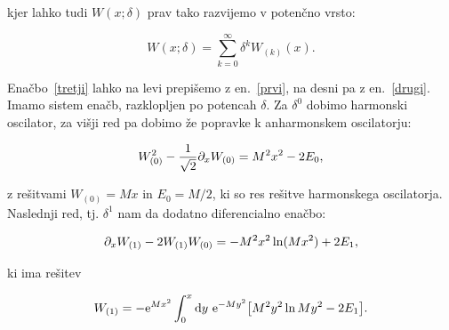\ni kjer lahko tudi $W(x;\delta)$ prav tako razvijemo v poten\v cno vrsto:

\begin{equation}
	W(x;\delta) = \sum_{k = 0}^\infty \delta^k W_{(k)}(x).
	\label{drugi}
\end{equation}

\ni Ena\v cbo~\eqref{tretji} lahko na levi prepi\v semo z en.~\eqref{prvi}, na desni pa z en.~\eqref{drugi}. Imamo sistem
ena\v cb, razklopljen po potencah $\delta$. Za $\delta^0$ dobimo harmonski oscilator, za vi\v sji red pa dobimo \v ze
popravke k anharmonskem oscilatorju:

\begin{equation}
	W_{(0)}^2 - \frac{1}{\sqrt{2}}\partial_x W_{(0)} = M^2x^2 - 2E_0,
\end{equation}

\ni z re\v sitvami $W_{(0)} = Mx$ in $E_0 = M/2$, ki so res re\v sitve harmonskega oscilatorja. Naslednji red, tj. $\delta^1$
nam da dodatno diferencialno ena\v cbo:

\begin{equation}
	\partial_x W_{(1)} - 2W_{(1)}W_{(0)} = -M^2x^2\ln(Mx^2) + 2E_1,
\end{equation}

ki ima re\v sitev

\begin{equation}
	W_{(1)} = -\text{e}^{Mx^2} \int_0^x \text{d} y\ \text{e}^{-My^2}\big[M^2y^2 \ln My^2 - 2E_1\big].
\end{equation}

